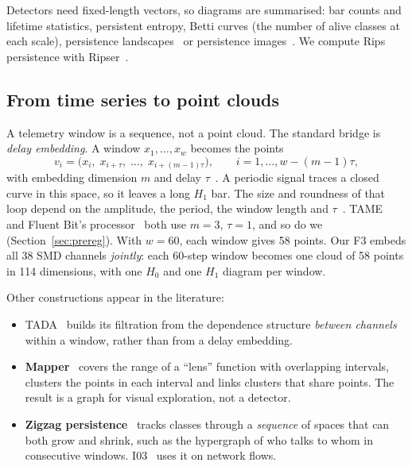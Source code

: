 Detectors need fixed-length vectors, so diagrams are summarised: bar counts and lifetime statistics, persistent entropy, Betti curves (the number of alive classes at each scale), persistence landscapes~\cite{A03} or persistence images~\cite{A04}. We compute Rips persistence with Ripser~\cite{A06}.

\subsection{From time series to point clouds}
A telemetry window is a sequence, not a point cloud. The standard bridge is \emph{delay embedding}. A window $x_1,\dots,x_w$ becomes the points
\[
  v_i = \bigl(x_i,\; x_{i+\tau},\; \dots,\; x_{i+(m-1)\tau}\bigr), \qquad i = 1,\dots,w-(m-1)\tau ,
\]
with embedding dimension $m$ and delay $\tau$~\cite{takens1981}. A periodic signal traces a closed curve in this space, so it leaves a long $H_1$ bar. The size and roundness of that loop depend on the amplitude, the period, the window length and $\tau$~\cite{A05}. TAME~\cite{D02} and Fluent Bit's  processor~\cite{fluentbit_pr11250} both use $m=3$, $\tau=1$, and so do we (Section~\ref{sec:prereg}). With $w=60$, each window gives 58 points.
Our F3 embeds all 38 SMD channels \emph{jointly}: each 60-step window becomes one cloud of 58 points in 114 dimensions, with one $H_0$ and one $H_1$ diagram per window.

Other constructions appear in the literature:
\begin{itemize}
  \item TADA~\cite{H04} builds its filtration from the dependence structure \emph{between channels} within a window, rather than from a delay embedding. 
  \item \textbf{Mapper}~\cite{A07} covers the range of a ``lens'' function with overlapping intervals, clusters the points in each interval and links clusters that share points. The result is a graph for visual exploration, not a detector.
  \item \textbf{Zigzag persistence}~\cite{I01} tracks classes through a \emph{sequence} of spaces that can both grow and shrink, such as the hypergraph of who talks to whom in consecutive windows. I03~\citep{I03} uses it on network flows.
\end{itemize}

